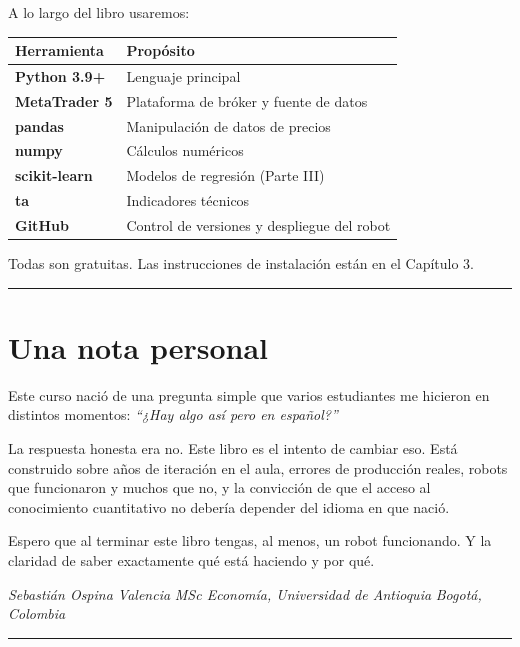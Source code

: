 \documentclass[12pt, a4paper, twoside, openright]{book}
\numberwithin{figure}{chapter}
\numberwithin{table}{chapter}
\begin{document}
A lo largo del libro usaremos:

\begin{longtable}[]{@{}ll@{}}
\toprule\noalign{}
Herramienta & Propósito \\
\midrule\noalign{}
\endhead
\bottomrule\noalign{}
\endlastfoot
\textbf{Python 3.9+} & Lenguaje principal \\
\textbf{MetaTrader 5} & Plataforma de bróker y fuente de datos \\
\textbf{pandas} & Manipulación de datos de precios \\
\textbf{numpy} & Cálculos numéricos \\
\textbf{scikit-learn} & Modelos de regresión (Parte III) \\
\textbf{ta} & Indicadores técnicos \\
\textbf{GitHub} & Control de versiones y despliegue del robot \\
\end{longtable}

Todas son gratuitas. Las instrucciones de instalación están en el
Capítulo 3.

\begin{center}\rule{0.5\linewidth}{0.5pt}\end{center}

\section{Una nota personal}\label{una-nota-personal}

Este curso nació de una pregunta simple que varios estudiantes me
hicieron en distintos momentos: \emph{``¿Hay algo así pero en
español?''}

La respuesta honesta era no. Este libro es el intento de cambiar eso.
Está construido sobre años de iteración en el aula, errores de
producción reales, robots que funcionaron y muchos que no, y la
convicción de que el acceso al conocimiento cuantitativo no debería
depender del idioma en que nació.

Espero que al terminar este libro tengas, al menos, un robot
funcionando. Y la claridad de saber exactamente qué está haciendo y por
qué.

\emph{Sebastián Ospina Valencia} \emph{MSc Economía, Universidad de
Antioquia} \emph{Bogotá, Colombia}

\begin{center}\rule{0.5\linewidth}{0.5pt}\end{center}
\end{document}
